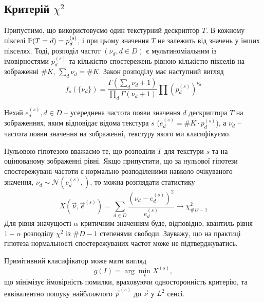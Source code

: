 \subsection{Критерій $\chi^2$}\label{section1.3a}

Припустимо, що використовуємо один текстурний дескриптор $T$.
В кожному пікселі $\P(T = d) = p^{(s)}_d$, і при цьому значення $T$ не залежить від значень у інших пікселях.
Тоді, розподіл частот $\left(\nu_d, d\in D\right)$ є мультиноміальним із імовірностями $p^{(s)}_d$ та 
кількістю спостережень рівною кількістю пікселів на зображенні $\# K$, $\sum_{d}\nu_d = \# K$. 
Закон розподілу має наступний вигляд
\begin{equation*}
    f_s(\{ \nu_d \}) = \frac {\Gamma (\sum_{d}\nu_{d}+1)}{\prod_{d}\Gamma (\nu_{d}+1)} \prod (p^{(s)}_d)^{\nu_d}
\end{equation*}

Нехай $e^{(s)}_d, d \in D$ -- усереднена частота появи значення $d$ дескриптора $T$ на зображеннях, яким відповідає відома текстура $s$
($e^{(s)}_d = \# K \cdot p^{(s)}_d$), а $\nu_d$ -- частота появи значення на зображенні, текстуру якого ми класифікуємо.

Нульовою гіпотезою вважаємо те, що розподіли $T$ для текстури $s$ та на оцінюваному зображенні рівні.
Якщо припустити, що за нульової гіпотези спостережувані частоти є нормально розподіленими навколо очікуваного значення, $\nu_d \sim \mathcal N(e^{(s)}_d, )$, то можна розглядати статистику
\begin{equation*}\label{e:chi2crit}
    X(\vec \nu,\vec e^{(s)}) = \sum_{d \in D} \frac{\left(\nu_d - e^{(s)}_d\right)^2}{e^{(s)}_d} \longrightarrow \chi^2_{\# D - 1}
\end{equation*}
Для рівня значущості $\alpha$ критичним значенням буде, відповідно, квантиль рівня $1-\alpha$ розподілу $\chi^2$ із $\# D - 1$ степенями свободи.
Зауважу, що на практиці гіпотеза нормальності спостережуваних частот може не підтверджуватись.

Примітивний класифікатор може мати вигляд
\begin{equation*}\label{e:chi2classifier}
    g(I) = \arg \min_{s} X^{(s)},
\end{equation*} 
що мінімізує ймовірність помилки, враховуючи односторонність критерію, та еквівалентно пошуку найближчого $\vec p^{(s)}$ до $\vec \nu$ у $L^2$ сенсі.

